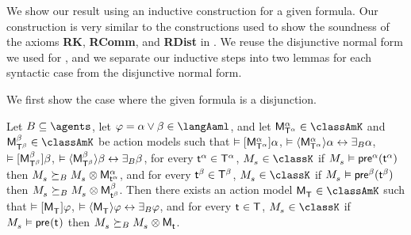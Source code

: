 We show our result using an inductive construction for a given formula.
Our construction is very similar to the constructions used to show the soundness of the axioms {\bf RK}, {\bf RComm}, and {\bf RDist} in \logicRmlK{}.
We reuse the disjunctive normal form we used for \logicRmlK{}, and we separate our inductive steps into two lemmas for each syntactic case from the disjunctive normal form.

We first show the case where the given formula is a disjunction.

\begin{lemma}\label{aaml-k-choice}
Let $\agentsB \subseteq \agents$, 
let $\phi = \alpha \lor \beta \in \langAaml$, and 
let $\aPModel[\alpha]{\aStatesT[\alpha]} \in \classAmK$ and $\aPModel[\beta]{\aStatesT[\beta]} \in \classAmK$ be action models such that 
$\entails \actionA{\aPModel[\alpha]{\aStatesT[\alpha]}} \alpha$, 
$\entails \actionE{\aPModel[\alpha]{\aStatesT[\alpha]}} \alpha \iff \someactsBs \alpha$, 
$\entails \actionA{\aPModel[\beta]{\aStatesT[\beta]}} \beta$,
$\entails \actionE{\aPModel[\beta]{\aStatesT[\beta]}} \beta \iff \someactsBs \beta$,
for every $\aStateT[\alpha] \in \aStatesT[\alpha]$, $\kPModel{\kStateS} \in \classK$ if $\kPModel{\kStateS} \entails \aPrecondition[\alpha](\aStateT[\alpha])$ then $\kPModel{\kStateS} \simulatesBs \kPModel{\kStateS} \exec \aPModel[\alpha]{\aStateT[\alpha]}$, and
for every $\aStateT[\beta] \in \aStatesT[\beta]$, $\kPModel{\kStateS} \in \classK$ if $\kPModel{\kStateS} \entails \aPrecondition[\beta](\aStateT[\beta])$ then $\kPModel{\kStateS} \simulatesBs \kPModel{\kStateS} \exec \aPModel[\beta]{\aStateT[\beta]}$.
Then there exists an action model $\aPModel{\aStatesT} \in \classAmK$ such that 
$\entails \actionA{\aPModel{\aStatesT}} \phi$,
$\entails \actionE{\aPModel{\aStatesT}} \phi \iff \someactsBs \phi$, and
for every $\aStateT \in \aStatesT$, $\kPModel{\kStateS} \in \classK$ if $\kPModel{\kStateS} \entails \aPrecondition(\aStateT)$ then $\kPModel{\kStateS} \simulatesBs \kPModel{\kStateS} \exec \aPModel{\aStateT}$.
\end{lemma}

